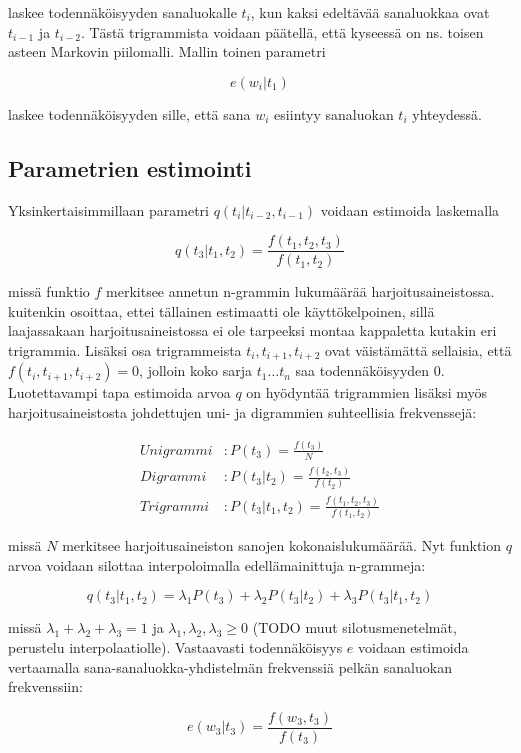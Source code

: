 \documentclass[utf8,bachelor,manualbib]{gradu3}
\begin{document}
laskee todennäköisyyden sanaluokalle $t_i$, kun kaksi edeltävää sanaluokkaa ovat $t_{i-1}$ ja $t_{i-2}$. Tästä trigrammista voidaan päätellä, että kyseessä on ns. toisen asteen Markovin piilomalli. Mallin toinen parametri

\[
e(w_i | t_1)
\]

laskee todennäköisyyden sille, että sana $w_i$ esiintyy sanaluokan $t_i$ yhteydessä.


\subsection{Parametrien estimointi}

Yksinkertaisimmillaan parametri $q(t_i|t_{i-2},t_{i-1})$ voidaan estimoida laskemalla

\[
q(t_3|t_1,t_2) = \frac{f(t_1,t_2,t_3)}{f(t_1,t_2)}
\]

missä funktio $f$ merkitsee annetun n-grammin lukumäärää harjoitusaineistossa. \citet{brants2000} kuitenkin osoittaa, ettei tällainen estimaatti ole käyttökelpoinen, sillä laajassakaan harjoitusaineistossa ei ole tarpeeksi montaa kappaletta kutakin eri trigrammia. Lisäksi osa trigrammeista $t_i,t_{i+1},t_{i+2}$ ovat väistämättä sellaisia, että $f(t_i,t_{i+1},t_{i+2}) = 0$, jolloin koko sarja $t_1 \ldots t_n$ saa todennäköisyyden $0$. Luotettavampi tapa estimoida arvoa $q$ on hyödyntää trigrammien lisäksi myös harjoitusaineistosta johdettujen uni- ja digrammien suhteellisia frekvenssejä:

\begin{align*}
Unigrammi&: P(t_3) = \frac{f(t_3)}{N} \\
Digrammi&: P(t_3 | t_2) = \frac{f(t_2, t_3)}{f(t_2)} \\
Trigrammi&: P(t_3 | t_1, t_2) = \frac{f(t_1,t_2,t_3)}{f(t_1,t_2)}
\end{align*}

missä $N$ merkitsee harjoitusaineiston sanojen kokonaislukumäärää. Nyt funktion $q$ arvoa voidaan silottaa interpoloimalla edellämainittuja n-grammeja:

\[
q(t_3 | t_1, t_2) = \lambda_1 P(t_3) + \lambda_2 P(t_3 | t_2) + \lambda_3 P(t_3 | t_1, t_2)
\]

missä $\lambda_1+\lambda_2+\lambda_3 = 1$ ja $\lambda_1,\lambda_2,\lambda_3 \geq 0$ (TODO muut silotusmenetelmät, perustelu interpolaatiolle). Vastaavasti todennäköisyys $e$ voidaan estimoida vertaamalla sana-sanaluokka-yhdistelmän frekvenssiä pelkän sanaluokan frekvenssiin:

\[
e(w_3|t_3) = \frac{f(w_3, t_3)}{f(t_3)}
\]
\end{document}
